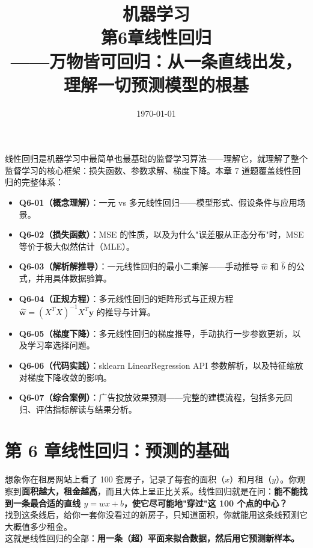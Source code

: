 \documentclass[a4paper,11pt]{ctexart}
\title{\textbf{机器学习\\第6章\quad 线性回归}\\[0.5em]
{\large\color{gray}——万物皆可回归：从一条直线出发，理解一切预测模型的根基}}
\date{\today}
\begin{document}
\maketitle

\begin{beginnerbox}
    线性回归是机器学习中最简单也最基础的监督学习算法——理解它，就理解了整个监督学习的核心框架：损失函数、参数求解、梯度下降。本章 7 道题覆盖线性回归的完整体系：
    \begin{itemize}
        \item \textbf{Q6-01（概念理解）}：一元 vs 多元线性回归——模型形式、假设条件与应用场景。
        \item \textbf{Q6-02（损失函数）}：MSE 的性质，以及为什么"误差服从正态分布"时，MSE 等价于极大似然估计（MLE）。
        \item \textbf{Q6-03（解析解推导）}：一元线性回归的最小二乘解——手动推导 $\hat{w}$ 和 $\hat{b}$ 的公式，并用具体数据验算。
        \item \textbf{Q6-04（正规方程）}：多元线性回归的矩阵形式与正规方程 $\hat{\boldsymbol{w}} = (X^TX)^{-1}X^T\boldsymbol{y}$ 的推导与计算。
        \item \textbf{Q6-05（梯度下降）}：多元线性回归的梯度推导，手动执行一步参数更新，以及学习率选择问题。
        \item \textbf{Q6-06（代码实践）}：sklearn LinearRegression API 参数解析，以及特征缩放对梯度下降收敛的影响。
        \item \textbf{Q6-07（综合案例）}：广告投放效果预测——完整的建模流程，包括多元回归、评估指标解读与结果分析。
    \end{itemize}
\end{beginnerbox}

\section{第 6 章\quad 线性回归：预测的基础}

\begin{metaphorbox}
    想象你在租房网站上看了 100 套房子，记录了每套的面积（$x$）和月租（$y$）。你观察到\textbf{面积越大，租金越高}，而且大体上呈正比关系。线性回归就是在问：\textbf{能不能找到一条最合适的直线 $y = wx + b$，使它尽可能地"穿过"这 100 个点的中心？}\\
    找到这条线后，给你一套你没看过的新房子，只知道面积，你就能用这条线预测它大概值多少租金。\\
    这就是线性回归的全部：\textbf{用一条（超）平面来拟合数据，然后用它预测新样本。}
\end{metaphorbox}
\end{document}
